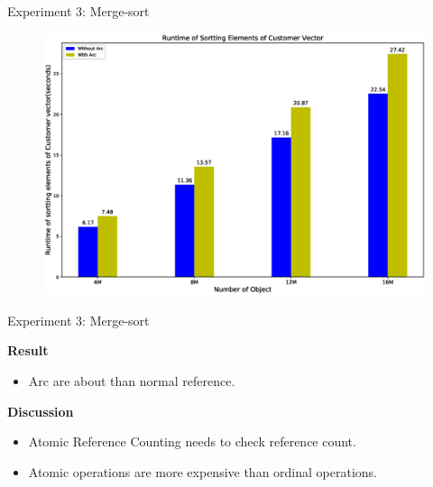 \documentclass[9pt]{beamer}
\begin{document}
\begin{frame}[fragile]{Experiment 3: Merge-sort}
    \vspace{-0.7cm}
    \begin{figure}[hp]
        \centering
        \begin{center}
                \includegraphics[width=1.1\textwidth]{images/rust_merge_sort.eps}
                \captionsetup{labelformat=empty}
        \end{center}
    \end{figure}
\end{frame}


\begin{frame}[fragile]{Experiment 3: Merge-sort}

    \textbf{Result}
    \begin{itemize}
        \item Arc are about  than normal reference.
    \end{itemize}

    \vspace{0.5cm}

    \textbf{Discussion}
    \begin{itemize}
        \item Atomic Reference Counting needs to check reference count.
        \item Atomic operations are more expensive than ordinal operations.
    \end{itemize}

\end{frame}
\end{document}
